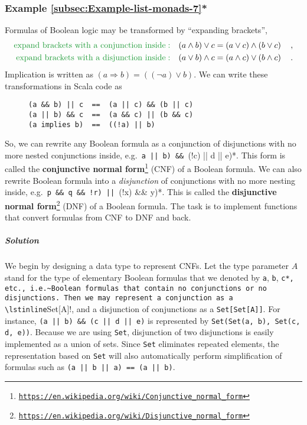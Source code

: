 \subsubsection{Example \label{subsec:Example-list-monads-7}\ref{subsec:Example-list-monads-7}{*}}

Formulas of Boolean logic may be transformed by ``expanding brackets'',
\begin{align*}
{\color{greenunder}\text{expand brackets with a conjunction inside}:}\quad & (a\wedge b)\vee c=\left(a\vee c\right)\wedge\left(b\vee c\right)\quad,\\
{\color{greenunder}\text{expand brackets with a disjunction inside}:}\quad & (a\vee b)\wedge c=\left(a\wedge c\right)\vee\left(b\wedge c\right)\quad.
\end{align*}
Implication is written as $(a\Rightarrow b)=((\neg a)\vee b)$. We
can write these transformations in Scala code as

\begin{wrapfigure}{l}{0.4\columnwidth}%
\vspace{-0.6\baselineskip}
\begin{lstlisting}
(a && b) || c  ==  (a || c) && (b || c)
(a || b) && c  ==  (a && c) || (b && c)
(a implies b)  ==  ((!a) || b)
\end{lstlisting}
\vspace{-0.8\baselineskip}
\end{wrapfigure}%

\noindent So, we can rewrite any Boolean formula as a conjunction
of disjunctions with no more nested conjunctions inside, e.g.~\lstinline*(a || b) && ((!c) || d || e)*.
This form is called the \textbf{conjunctive normal form}\footnote{\texttt{\href{https://en.wikipedia.org/wiki/Conjunctive_normal_form}{https://en.wikipedia.org/wiki/Conjunctive\_normal\_form}}}
(CNF) of a Boolean formula. We can also rewrite Boolean formula into
a \emph{disjunction} of conjunctions with no more nesting inside,
e.g.~\lstinline*(p && q && !r) || ((!x) && y)*. This is called the
\textbf{disjunctive normal form}\footnote{\texttt{\href{https://en.wikipedia.org/wiki/Disjunctive_normal_form}{https://en.wikipedia.org/wiki/Disjunctive\_normal\_form}}}
(DNF) of a Boolean formula. The task is to implement functions that
convert formulas from CNF to DNF and back. 

\subparagraph{Solution}

We begin by designing a data type to represent CNFs. Let the type
parameter $A$ stand for the type of elementary Boolean formulas that
we denoted by \lstinline!a!, \lstinline!b!, \lstinline*!c*, etc.,
i.e.~Boolean formulas that contain no conjunctions or no disjunctions.
Then we may represent a conjunction as a \lstinline!Set[A]!, and
a disjunction of conjunctions as a \lstinline!Set[Set[A]]!. For instance,
\lstinline!(a || b) && (c || d || e)! is represented by \lstinline!Set(Set(a, b), Set(c, d, e))!.
Because we are using \lstinline!Set!, disjunction of two disjunctions
is easily implemented as a union of sets. Since \lstinline!Set! eliminates
repeated elements, the representation based on \lstinline!Set! will
also automatically perform simplification of formulas such as \lstinline!(a || b || a) == (a || b)!.

